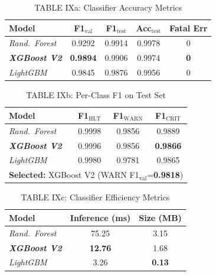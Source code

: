 \documentclass[conference]{IEEEtran}
\begin{document}
\begin{table}[htbp]
\caption{TABLE IXa: Classifier Accuracy Metrics}
\centering
\begin{tabular}{lcccc}
\hline
\textbf{Model} & \textbf{F1$_\text{val}$} & \textbf{F1$_\text{test}$} & \textbf{Acc$_\text{test}$} & \textbf{Fatal Err} \\
\hline
\textit{Rand.\ Forest}        & 0.9292          & 0.9914 & 0.9978 & 0 \\
\textbf{\textit{XGBoost V2}}  & \textbf{0.9894} & 0.9906 & 0.9974 & \textbf{0} \\
\textit{LightGBM}             & 0.9845          & 0.9876 & 0.9956 & 0 \\
\hline
\end{tabular}
\label{tab:clf_results_a}
\end{table}

\begin{table}[htbp]
\caption{TABLE IXb: Per-Class F1 on Test Set}
\centering
\begin{tabular}{lccc}
\hline
\textbf{Model} & \textbf{F1$_\text{HLT}$} & \textbf{F1$_\text{WARN}$} & \textbf{F1$_\text{CRIT}$} \\
\hline
\textit{Rand.\ Forest}        & 0.9998 & 0.9856 & 0.9889 \\
\textbf{\textit{XGBoost V2}}  & 0.9996 & 0.9856 & \textbf{0.9866} \\
\textit{LightGBM}             & 0.9980 & 0.9781 & 0.9865 \\
\hline
\multicolumn{4}{l}{\textbf{Selected:} XGBoost V2 (WARN F1$_\text{val}$=\textbf{0.9818})} \\
\hline
\end{tabular}
\label{tab:clf_results_b}
\end{table}

\begin{table}[htbp]
\caption{TABLE IXc: Classifier Efficiency Metrics}
\centering
\begin{tabular}{lcc}
\hline
\textbf{Model} & \textbf{Inference (ms)} & \textbf{Size (MB)} \\
\hline
\textit{Rand.\ Forest}        & 75.25          & 3.15 \\
\textbf{\textit{XGBoost V2}}  & \textbf{12.76} & 1.68 \\
\textit{LightGBM}             & 3.26           & \textbf{0.13} \\
\hline
\end{tabular}
\label{tab:clf_results_c}
\end{table}
\end{document}
